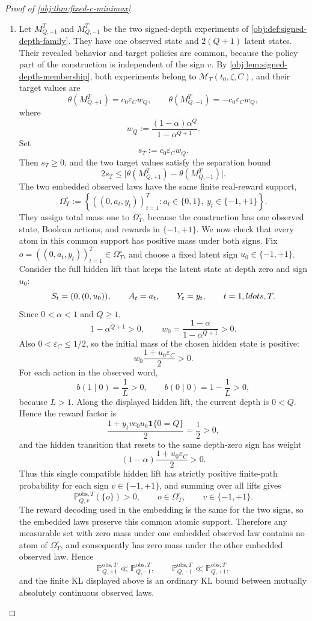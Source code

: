 \begin{proof}[Proof of \cref{obj:thm:fixed-c-minimax}]
\begin{enumerate}
\item Let \(M_{Q,+1}^T\) and \(M_{Q,-1}^T\) be the two signed-depth experiments of \cref{obj:def:signed-depth-family}. They have one observed state and \(2(Q+1)\) latent states. Their revealed behavior and target policies are common, because the policy part of the construction is independent of the sign \(v\). By \cref{obj:lem:signed-depth-membership}, both experiments belong to \(\mathcal M_T(t_0,\zeta,C)\), and their target values are
\[
\theta(M_{Q,+1}^T)=c_0\varepsilon_C w_Q,
\qquad
\theta(M_{Q,-1}^T)=-c_0\varepsilon_C w_Q,
\]
where
\[
w_Q
:=
\frac{(1-\alpha)\alpha^Q}{1-\alpha^{Q+1}} .
\]
Set
\[
s_T:=c_0\varepsilon_C w_Q .
\]
Then \(s_T\ge0\), and the two target values satisfy the separation bound
\[
2s_T
\le
\bigl|\theta(M_{Q,+1}^T)-\theta(M_{Q,-1}^T)\bigr|.
\]
The two embedded observed laws have the same finite real-reward support,
\[
\Omega_T^\circ
:=
\left\{
((0,a_t,y_t))_{t=1}^T:
 a_t\in\{0,1\},\ y_t\in\{-1,+1\}
\right\}.
\]
They assign total mass one to \(\Omega_T^\circ\), because the construction has one observed state, Boolean actions, and rewards in \(\{-1,+1\}\). We now check that every atom in this common support has positive mass under both signs. Fix
\(o=((0,a_t,y_t))_{t=1}^T\in\Omega_T^\circ\), and choose a fixed latent sign \(u_0\in\{-1,+1\}\). Consider the full hidden lift that keeps the latent state at depth zero and sign \(u_0\):
\[
S_t=(0,(0,u_0)),
\qquad
A_t=a_t,
\qquad
Y_t=y_t,
\qquad t=1,\\ldots,T.
\]
Since \(0<\alpha<1\) and \(Q\ge1\),
\[
1-\alpha^{Q+1}>0,
\qquad
w_0=\frac{1-\alpha}{1-\alpha^{Q+1}}>0.
\]
Also \(0<\varepsilon_C\le1/2\), so the initial mass of the chosen hidden state is positive:
\[
w_0\frac{1+u_0\varepsilon_C}{2}>0.
\]
For each action in the observed word,
\[
b(1\mid0)=\frac1L>0,
\qquad
b(0\mid0)=1-\frac1L>0,
\]
because \(L>1\). Along the displayed hidden lift, the current depth is \(0<Q\). Hence the reward factor is
\[
\frac{1+y_tvc_0u_0\mathbf 1\{0=Q\}}{2}=\frac12>0,
\]
and the hidden transition that resets to the same depth-zero sign has weight
\[
(1-\alpha)\frac{1+u_0\varepsilon_C}{2}>0.
\]
Thus this single compatible hidden lift has strictly positive finite-path probability for each sign \(v\in\{-1,+1\}\), and summing over all lifts gives
\[
\mathbb P_{Q,v}^{\mathrm{obs},T}(\{o\})>0,
\qquad o\in\Omega_T^\circ,
\qquad v\in\{-1,+1\}.
\]
The reward decoding used in the embedding is the same for the two signs, so the embedded laws preserve this common atomic support. Therefore any measurable set with zero mass under one embedded observed law contains no atom of \(\Omega_T^\circ\), and consequently has zero mass under the other embedded observed law. Hence
\[
\mathbb P_{Q,+1}^{\mathrm{obs},T}
\ll
\mathbb P_{Q,-1}^{\mathrm{obs},T},
\qquad
\mathbb P_{Q,-1}^{\mathrm{obs},T}
\ll
\mathbb P_{Q,+1}^{\mathrm{obs},T},
\]
and the finite KL displayed above is an ordinary KL bound between mutually absolutely continuous observed laws. %


\end{enumerate}
\end{proof}
